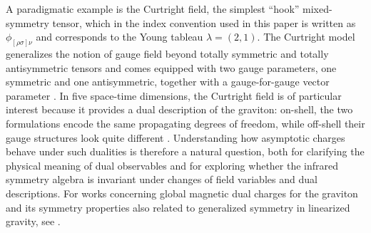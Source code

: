 \documentclass[a4paper,12pt]{article}
\begin{document}
A paradigmatic example is the Curtright field, the simplest ``hook'' mixed-symmetry tensor, which in the index convention used in this paper is written as \( \phi_{[\rho\sigma]\nu} \) and corresponds to the Young tableau \( \lambda=(2,1) \). The Curtright model generalizes the notion of gauge field beyond totally symmetric and totally antisymmetric tensors and comes equipped with two gauge parameters, one symmetric and one antisymmetric, together with a gauge-for-gauge vector parameter \cite{CURTRIGHT1985304}. In five space-time dimensions, the Curtright field is of particular interest because it provides a dual description of the graviton: on-shell, the two formulations encode the same propagating degrees of freedom, while off-shell their gauge structures look quite different \cite{hamermesh1989group, NicolasBoulanger_2003}. Understanding how asymptotic charges behave under such dualities is therefore a natural question, both for clarifying the physical meaning of dual observables and for exploring whether the infrared symmetry algebra is invariant under changes of field variables and dual descriptions. For works concerning global magnetic dual charges for the graviton and its symmetry properties also related to generalized symmetry in linearized gravity, see \cite{Hull:2023iny,Hull:2024qpy,2024CQGra..41s5012H,Hull:2024xgo,Hull:2024bcl,Hull:2024ism}. 
\end{document}
